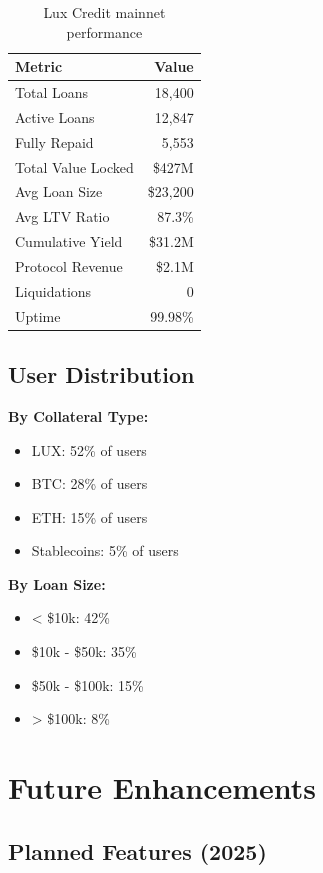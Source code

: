 \documentclass[11pt,a4paper]{article}
\begin{document}
\begin{table}[h]
\centering
\begin{tabular}{@{}lr@{}}
\toprule
\textbf{Metric} & \textbf{Value} \\ \midrule
Total Loans & 18,400 \\
Active Loans & 12,847 \\
Fully Repaid & 5,553 \\
Total Value Locked & \$427M \\
Avg Loan Size & \$23,200 \\
Avg LTV Ratio & 87.3\% \\
Cumulative Yield & \$31.2M \\
Protocol Revenue & \$2.1M \\
Liquidations & 0 \\
Uptime & 99.98\% \\ \bottomrule
\end{tabular}
\caption{Lux Credit mainnet performance}
\end{table}

\subsection{User Distribution}

\textbf{By Collateral Type:}
\begin{itemize}
\item LUX: 52\% of users
\item BTC: 28\% of users
\item ETH: 15\% of users
\item Stablecoins: 5\% of users
\end{itemize}

\textbf{By Loan Size:}
\begin{itemize}
\item < \$10k: 42\%
\item \$10k - \$50k: 35\%
\item \$50k - \$100k: 15\%
\item > \$100k: 8\%
\end{itemize}

\section{Future Enhancements}

\subsection{Planned Features (2025)}
\end{document}
